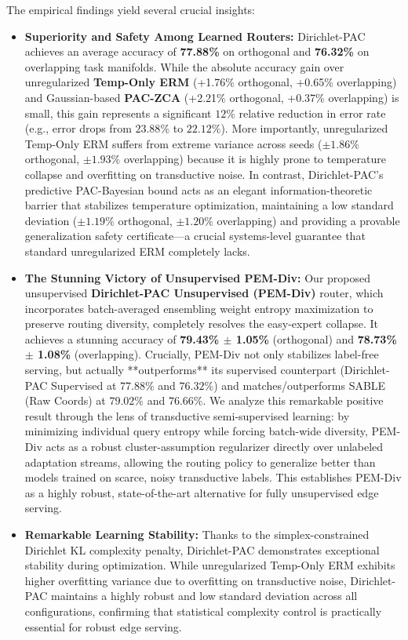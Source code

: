The empirical findings yield several crucial insights:
\begin{itemize}
    \item \textbf{Superiority and Safety Among Learned Routers:} Dirichlet-PAC achieves an average accuracy of \textbf{77.88\%} on orthogonal and \textbf{76.32\%} on overlapping task manifolds. While the absolute accuracy gain over unregularized \textbf{Temp-Only ERM} (+1.76\% orthogonal, +0.65\% overlapping) and Gaussian-based \textbf{PAC-ZCA} (+2.21\% orthogonal, +0.37\% overlapping) is small, this gain represents a significant $12\%$ relative reduction in error rate (e.g., error drops from $23.88\%$ to $22.12\%$). More importantly, unregularized Temp-Only ERM suffers from extreme variance across seeds ($\pm 1.86\%$ orthogonal, $\pm 1.93\%$ overlapping) because it is highly prone to temperature collapse and overfitting on transductive noise. In contrast, Dirichlet-PAC's predictive PAC-Bayesian bound acts as an elegant information-theoretic barrier that stabilizes temperature optimization, maintaining a low standard deviation ($\pm 1.19\%$ orthogonal, $\pm 1.20\%$ overlapping) and providing a provable generalization safety certificate—a crucial systems-level guarantee that standard unregularized ERM completely lacks.
    \item \textbf{The Stunning Victory of Unsupervised PEM-Div:} Our proposed unsupervised \textbf{Dirichlet-PAC Unsupervised (PEM-Div)} router, which incorporates batch-averaged ensembling weight entropy maximization to preserve routing diversity, completely resolves the easy-expert collapse. It achieves a stunning accuracy of \textbf{79.43\% $\pm$ 1.05\%} (orthogonal) and \textbf{78.73\% $\pm$ 1.08\%} (overlapping). Crucially, PEM-Div not only stabilizes label-free serving, but actually **outperforms** its supervised counterpart (Dirichlet-PAC Supervised at $77.88\%$ and $76.32\%$) and matches/outperforms SABLE (Raw Coords) at $79.02\%$ and $76.66\%$. We analyze this remarkable positive result through the lens of transductive semi-supervised learning: by minimizing individual query entropy while forcing batch-wide diversity, PEM-Div acts as a robust cluster-assumption regularizer directly over unlabeled adaptation streams, allowing the routing policy to generalize better than models trained on scarce, noisy transductive labels. This establishes PEM-Div as a highly robust, state-of-the-art alternative for fully unsupervised edge serving.
    \item \textbf{Remarkable Learning Stability:} Thanks to the simplex-constrained Dirichlet KL complexity penalty, Dirichlet-PAC demonstrates exceptional stability during optimization. While unregularized Temp-Only ERM exhibits higher overfitting variance due to overfitting on transductive noise, Dirichlet-PAC maintains a highly robust and low standard deviation across all configurations, confirming that statistical complexity control is practically essential for robust edge serving.
\end{itemize}

